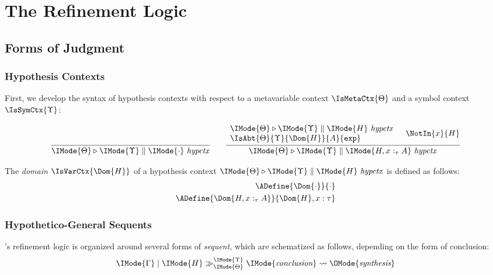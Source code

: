 \chapter{The Refinement Logic}

\newcommand\PRLSequent[6]{
  \IMode{#1}\mid%
  \IMode{#2}\gg_{\IMode{#3}}^{\IMode{#4}}%
  \IMode{#5}\leadsto%
  \OMode{#6}%
}

\newcommand\IsHypCtx[3]{
  \IMode{#1}\triangleright%
  \IMode{#2}\parallel%
  \IMode{#3}\ \mathit{hypctx}%
}

\section{Forms of Judgment}

\subsection{Hypothesis Contexts}
First, we develop the syntax of hypothesis contexts with respect to a
metavariable context $\IsMetaCtx{\Theta}$ and a symbol context
$\IsSymCtx{\Upsilon}$:

\[
  \infer{
    \IsHypCtx{\Theta}{\Upsilon}{\cdot}
  }{}
  \qquad
  \infer{
    \IsHypCtx{\Theta}{\Upsilon}{H, x:_\tau A}
  }{
    \begin{array}{l}
      \IsHypCtx{\Theta}{\Upsilon}{H}\\
      \IsAbt{\Theta}{\Upsilon}{\Dom{H}}{A}{\AbtSortExp}
    \end{array}&
    \NotIn{x}{H}
  }
\]

The \emph{domain} $\IsVarCtx{\Dom{H}}$ of a hypothesis context
$\IsHypCtx{\Theta}{\Upsilon}{H}$ is defined as follows:
\begin{align*}
  \ADefine{\Dom{\cdot}}{\cdot}\\
  \ADefine{\Dom{H,x:_\tau A}}{\Dom{H}, x : \tau}
\end{align*}

\subsection{Hypothetico-General Sequents}

\RedPRL's refinement logic is organized around several forms of \emph{sequent},
which are schematized as follows, depending on the form of conclusion:
\[
  \PRLSequent{\Gamma}{H}{\Theta}{\Upsilon}{\textit{conclusion}}{\textit{synthesis}}
\]

\newcommand\IsConcl[5]{%
  \IMode{#1}\triangleright%
  \IMode{#2}\parallel%
  \IMode{#3}\vdash%
  \lfloor\IMode{#4}\rfloor\ \mathit{concl}%
  \leadsto \OMode{#5}%
}

